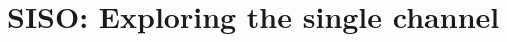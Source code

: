 \chapter{SISO: Exploring the single channel}
\label{chapter:siso}
\thispagestyle{myheadings}

\graphicspath{{_SISO/Figures/}}

